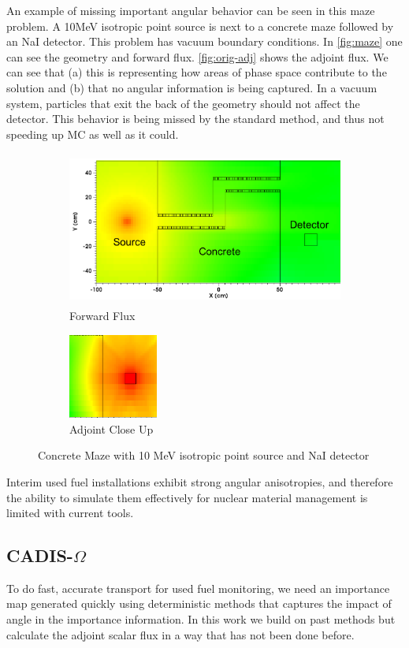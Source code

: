 \documentclass[12pt]{article}
\begin{document}
An example of missing important angular behavior can be seen in this maze problem. 
A 10MeV isotropic point source is next to a concrete maze followed by an NaI detector. 
This problem has vacuum boundary conditions. 
In \autoref{fig:maze} one can see the geometry and forward flux. 
\autoref{fig:orig-adj} shows the adjoint flux. 
We can see that (a) this is representing how areas of phase space contribute to the solution and (b) that no angular information is being captured.
In a vacuum system, particles that exit the back of the geometry should not affect the detector. 
This behavior is being missed by the standard method, and thus not speeding up MC as well as it could. 
\begin{figure}
\centering
\begin{subfigure}{.75\textwidth}
  \centering
  \includegraphics[height=2in,clip]{maze-forward.png}
  \caption{Forward Flux}
  \label{fig:maze}
\end{subfigure}%
\begin{subfigure}{.25\textwidth}
  \centering
  \includegraphics[height=1.1in,clip]{maze-adj-orig.png}
  \caption{Adjoint Close Up}
  \label{fig:orig-adj}
\end{subfigure}
\caption{Concrete Maze with 10 MeV isotropic point source and NaI detector}
\label{fig:adjoint}
\end{figure}

Interim used fuel installations exhibit strong angular anisotropies, and therefore the ability to simulate them effectively for nuclear material management is limited with current tools. 

\subsection{CADIS-$\Omega$}
To do fast, accurate transport for used fuel monitoring, we need an importance map generated quickly using deterministic methods that captures the impact of angle in the importance information. 
In this work we build on past methods but calculate the adjoint scalar flux in a way that has not been done before.
\end{document}
